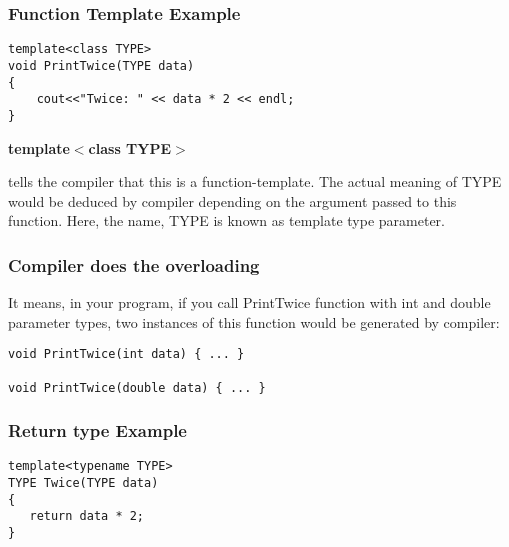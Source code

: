 \documentclass{beamer}
\newtheorem{Key points}{Key points}
\begin{document}
\begin{frame}[fragile]
\frametitle{Function Template Example}
\begin{lstlisting}
template<class TYPE>
void PrintTwice(TYPE data)
{
    cout<<"Twice: " << data * 2 << endl;
}
\end{lstlisting}

{\color{red}\textbf{template$<$class TYPE$>$}}

tells the compiler that this is a function-template. The actual meaning of TYPE would be deduced by compiler depending on the argument passed to this function. Here, the name, TYPE is known as template type parameter.
\end{frame}


\begin{frame}[fragile]
\frametitle{Compiler does the overloading}
It means, in your program, if you call PrintTwice function with int and double parameter types, two instances of this function would be generated by compiler:

\begin{lstlisting}
void PrintTwice(int data) { ... }

void PrintTwice(double data) { ... }
\end{lstlisting}
\end{frame}

\begin{frame}[fragile]
\frametitle{Return type Example}

\begin{lstlisting}
template<typename TYPE>
TYPE Twice(TYPE data)
{
   return data * 2;
}
\end{lstlisting}
\end{frame}
\end{document}
